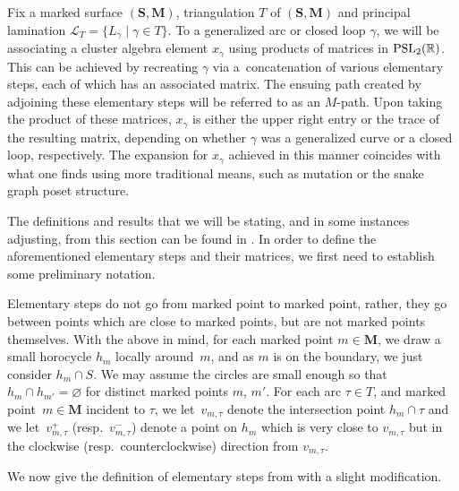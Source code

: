 \documentclass[pdftex]{sigma}
\numberwithin{equation}{section}
\theoremstyle{definition}
\newcommand{\SM}{(\mathbf{S}, \mathbf{M})}
\begin{document}
Fix a marked surface $\SM$, triangulation $T$ of $\SM$ and principal lamination $\mathcal{L}_T=\{L_{\gamma} \mid \gamma\in T\}$. To a generalized arc or closed loop $\gamma$, we will be associating a cluster algebra element $x_{\gamma}$ using products of matrices in ${\rm PSL}_2(\mathbb{R})$. This can be achieved by recreating $\gamma$ via a~concatenation of various elementary steps, each of which has an associated matrix. The ensuing path created by adjoining these elementary steps will be referred to as an $M$-path. Upon taking the product of these matrices, $x_{\gamma}$ is either the upper right entry or the trace of the resulting matrix, depending on whether $\gamma$ was a generalized curve or a closed loop, respectively. The expansion for $x_{\gamma}$ achieved in this manner coincides with what one finds using more traditional means, such as mutation or the snake graph poset structure.

The definitions and results that we will be stating, and in some instances adjusting, from this section can be found in \cite[Sections~4 and~5]{MW13}. In order to define the aforementioned elementary steps and their matrices, we first need to establish some preliminary notation.

Elementary steps do not go from marked point to marked point, rather, they go between points which are close to marked points, but are not marked points themselves. With the above in mind, for each marked point $m\in \mathbf{M}$, we draw a small horocycle $h_m$ locally around~$m$, and as $m$ is on the boundary, we just consider $h_m\cap S$. We may assume the circles are small enough so that $h_m\cap h_{m'}=\varnothing$ for distinct marked points $m$, $m'$. For each arc $\tau\in T$, and marked point~${m\in \mathbf{M}}$ incident to $\tau$, we let~$v_{m, \tau}$ denote the intersection point $h_m\cap \tau$ and we let~$v^{+}_{m, \tau}$ (resp.\ $v^{-}_{m, \tau}$) denote a point on $h_m$ which is very close to $v_{m, \tau}$ but in the clockwise (resp.\ counterclockwise) direction from $v_{m, \tau}$.

We now give the definition of elementary steps from \cite{MW13} with a slight modification.
\end{document}
